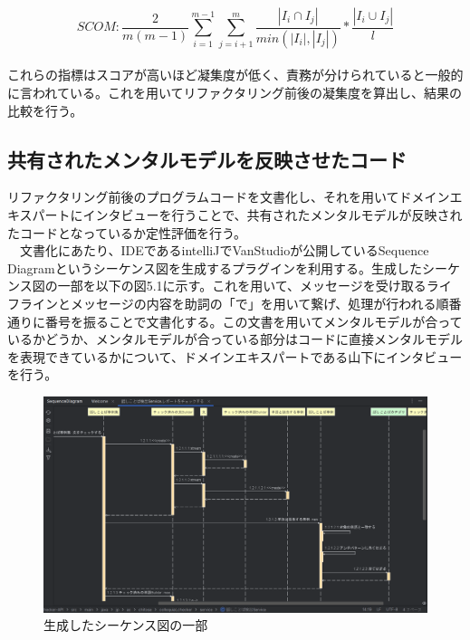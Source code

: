 \documentclass[12pt, a4paper]{jreport}
\begin{document}
\begin{equation}
SCOM:
\frac{2}{m(m-1)}\sum^{m-1}_{i=1}\sum^{m}_{j=i+1}\frac{|{I}_{i}\cap{I}_{j}|}{min(|{I}_{i}|,|{I}_{j}|)}*\frac{|{I}_{i}\cup{I}_{j}|}{l}
\end{equation}
\\これらの指標はスコアが高いほど凝集度が低く、責務が分けられていると一般的に言われている。これを用いてリファクタリング前後の凝集度を算出し、結果の比較を行う。
\subsection{共有されたメンタルモデルを反映させたコード}
リファクタリング前後のプログラムコードを文書化し、それを用いてドメインエキスパートにインタビューを行うことで、共有されたメンタルモデルが反映されたコードとなっているか定性評価を行う。
\\　文書化にあたり、IDEであるintelliJでVanStudioが公開しているSequence Diagramというシーケンス図を生成するプラグインを利用する。生成したシーケンス図の一部を以下の図5.1に示す。これを用いて、メッセージを受け取るライフラインとメッセージの内容を助詞の「で」を用いて繋げ、処理が行われる順番通りに番号を振ることで文書化する。この文書を用いてメンタルモデルが合っているかどうか、メンタルモデルが合っている部分はコードに直接メンタルモデルを表現できているかについて、ドメインエキスパートである山下にインタビューを行う。
\begin{figure}[H]
\centering
\includegraphics[width=1\linewidth]{image/sequence.png}
\caption{生成したシーケンス図の一部}
\label{fig:enter-label}
\end{figure}
\end{document}
